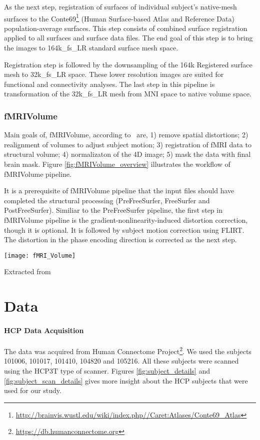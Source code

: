 As the next step, registration of surfaces of individual subject's native-mesh surfaces to the Conte69\footnote{\url{http://brainvis.wustl.edu/wiki/index.php//Caret:Atlases/Conte69\_Atlas}} (Human Surface-based Atlas and Reference Data) population-average surfaces. This step consists of combined surface registration applied to all surfaces and surface data files. The end goal of this step is to bring the images to 164k\_fs\_LR standard surface mesh space. 

Registration step is followed by the downsampling of the 164k Registered surface mesh to 32k\_fs\_LR space. These lower resolution images are suited for functional and connectivity analyses. The last step in this pipeline is transformation of the 32k\_fs\_LR mesh from MNI space to native volume space. 




\subsubsection{fMRIVolume}
Main goals of, fMRIVolume, according to~\cite{Gla13} are, 1) remove spatial distortions; 2) realignment of volumes to adjust subject motion; 3) registration of fMRI data to structural volume; 4) normalizaton of the 4D image; 5) mask the data with final brain mask. Figure \ref{fig:fMRIVolume_overview} illustrates the workflow of fMRIVolume pipeline.

It is a prerequisite of fMRIVolume pipeline that the input files should have completed the structural processing (PreFreeSurfer, FreeSurfer and PostFreeSurfer). Similiar to the PreFreeSurfer pipeline, the first step in fMRIVolume pipeline is the gradient-nonlinearity-induced distortion correction, though it is optional. It is followed by subject motion correction using FLIRT. The distortion in the phase encoding direction is corrected as the next step. 
\begin{center}
  \texttt{[image: fMRI\_Volume]}
  \label{fig:fMRIVolume_overview}
  \caption*{Extracted from \cite{Gla13}}
\end{center}

\section{Data}
\paragraph{HCP Data Acquisition}
The data was acquired from Human Connectome Project\footnote{\url{https://db.humanconnectome.org}}. We used the subjects 101006, 101017, 101410, 104820 and 105216. All these subjects were scanned using the HCP3T type of scanner. Figures \ref{fig:subject_details} and \ref{fig:subject_scan_details} gives more insight about the HCP subjects that were used for our study. 

